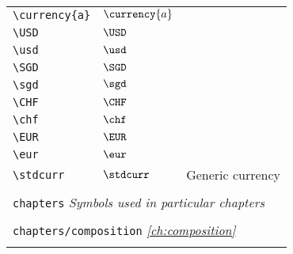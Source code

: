 \begin{longtable}{lll}
  \hline
  {\color[rgb]{0.5,0.5,0.5}\texttt{\textbackslash currency\{a\}}}                                           & $\currency{a}$             & \\
  {\color[rgb]{0.5,0.5,0.5}\texttt{\textbackslash USD}}                                                     & $\USD$                     & \\
  {\color[rgb]{0.5,0.5,0.5}\texttt{\textbackslash usd}}                                                     & $\usd$                     & \\
  {\color[rgb]{0.5,0.5,0.5}\texttt{\textbackslash SGD}}                                                     & $\SGD$                     & \\
  {\color[rgb]{0.5,0.5,0.5}\texttt{\textbackslash sgd}}                                                     & $\sgd$                     & \\
  {\color[rgb]{0.5,0.5,0.5}\texttt{\textbackslash CHF}}                                                     & $\CHF$                     & \\
  {\color[rgb]{0.5,0.5,0.5}\texttt{\textbackslash chf}}                                                     & $\chf$                     & \\
  {\color[rgb]{0.5,0.5,0.5}\texttt{\textbackslash EUR}}                                                     & $\EUR$                     & \\
  {\color[rgb]{0.5,0.5,0.5}\texttt{\textbackslash eur}}                                                     & $\eur$                     & \\
  {\color[rgb]{0.5,0.5,0.5}\texttt{\textbackslash stdcurr}}                                                 & $\stdcurr$                 & Generic currency                                        \\
  &                            &                                                         \\
  \multicolumn{3}{l}{{\color[rgb]{0.5,0.5,0.5}\texttt{chapters}} \emph{Symbols used in particular chapters}}
  \\
  \hline
  \hline
  &                            &                                                         \\
  \multicolumn{3}{l}{{\color[rgb]{0.5,0.5,0.5}\texttt{chapters/composition}} \emph{\cref{ch:composition}}}
  \\
  \hline
  &                            &                                                         \\

\end{longtable}
